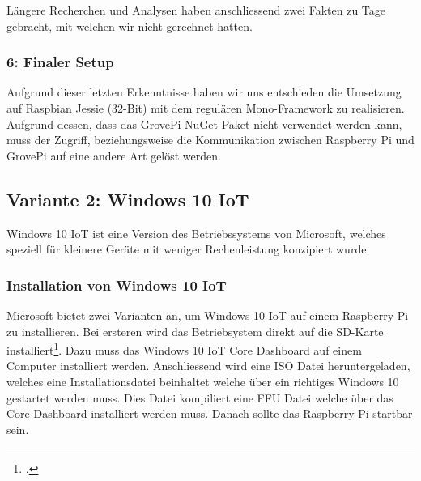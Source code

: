 Längere Recherchen und Analysen haben anschliessend zwei Fakten zu Tage gebracht, mit welchen wir nicht gerechnet hatten.
\begin{itemize}
\end{itemize}


\subsubsection{6: Finaler Setup}
Aufgrund dieser letzten Erkenntnisse haben wir uns entschieden die Umsetzung auf Raspbian Jessie (32-Bit) mit dem regulären Mono-Framework zu realisieren. Aufgrund dessen, dass das GrovePi NuGet Paket nicht verwendet werden kann, muss der Zugriff, beziehungsweise die Kommunikation zwischen Raspberry Pi und GrovePi auf eine andere Art gelöst werden.


\subsection{Variante 2: Windows 10 IoT}
Windows 10 IoT ist eine Version des Betriebssystems von Microsoft, welches speziell für kleinere Geräte mit weniger Rechenleistung konzipiert wurde.

\subsubsection{Installation von Windows 10 IoT}
Microsoft bietet zwei Varianten an, um Windows 10 IoT auf einem Raspberry Pi zu installieren. Bei ersteren wird das Betriebsystem direkt auf die SD-Karte installiert\footcite{install_win10iot_2016-04-25}. Dazu muss das Windows 10 IoT Core Dashboard auf einem Computer installiert werden. Anschliessend wird eine ISO Datei heruntergeladen, welches eine Installationsdatei beinhaltet welche über ein richtiges Windows 10 gestartet werden muss. Dies Datei kompiliert eine FFU Datei welche über das Core Dashboard installiert werden muss. Danach sollte das Raspberry Pi startbar sein. 

